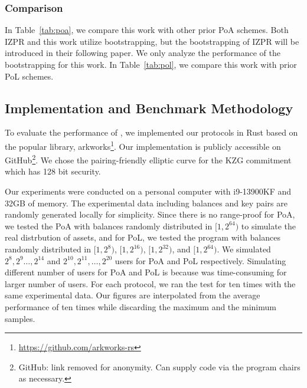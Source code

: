 \subsubsection{Comparison}



In Table~\ref{tab:poa}, we compare this work with other prior PoA schemes. Both IZPR and this work utilize bootstrapping, but the bootstrapping of IZPR will be introduced in their following paper. We only analyze the performance of the bootstrapping for this work. In Table~\ref{tab:pol}, we compare this work with prior PoL schemes.


\subsection{Implementation and Benchmark Methodology}



To evaluate the performance of \Sys, we implemented our protocols in Rust based on the popular library, arkworks\footnote{\url{https://github.com/arkworks-rs}}. Our implementation is publicly accessible on GitHub\footnote{GitHub: link removed for anonymity. Can supply code via the program chairs as necessary.}. We chose the pairing-friendly elliptic curve \bls for the KZG commitment which has 128 bit security.

Our experiments were conducted on a personal computer with i9-13900KF and 32GB of memory. The experimental data including balances and \secp key pairs are randomly generated locally for simplicity. Since there is no range-proof for PoA, we tested the PoA with balances randomly distributed in $[1,2^{64})$ to simulate the real distrbution of assets, and for PoL, we tested the program with balances randomly distributed in $[1,2^8)$, $[1,2^{16})$, $[1,2^{32})$, and $[1,2^{64})$. We simulated $2^8,2^9\dots,2^{14}$ and $2^{10},2^{11},\dots,2^{20}$ users for PoA and PoL respectively. Simulating different number of users for PoA and PoL is because \bootstrap was time-consuming for larger number of users. For each protocol, we ran the test for ten times with the same experimental data. Our figures are interpolated from the average performance of ten times while discarding the maximum and the minimum samples.

